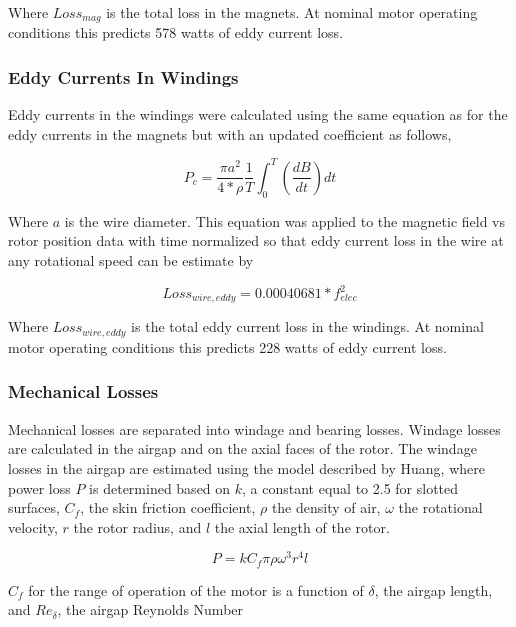 \documentclass[]{aiaa-tc}%
\begin{document}
Where $Loss_{mag}$ is the total loss in the magnets. At nominal motor operating conditions this predicts 578 watts of eddy current loss.

\subsubsection{Eddy Currents In Windings}
Eddy currents in the windings were calculated using the same equation as for the eddy currents in the magnets but with an updated coefficient as follows,

\begin{equation}
P_{c} = \frac{\pi a^2}{4*\rho}\frac{1}{T}\int_{0}^{T}(\frac{dB}{dt})dt
\label{eq:EddyLoss3}
\end{equation}

Where $a$ is the wire diameter. This equation was applied to the magnetic field vs rotor position data with time normalized so that eddy current loss in the wire at any rotational speed can be estimate by

\begin{equation}
Loss_{wire,eddy} = 0.00040681*f_{elec}^{2}
\label{eq:EddyLoss4}
\end{equation}

Where $Loss_{wire,eddy}$ is the total eddy current loss in the windings. At nominal motor operating conditions this predicts 228 watts of eddy current loss.

\subsubsection{Mechanical Losses}

Mechanical losses are separated into windage and bearing losses. Windage losses are calculated in the airgap and on the axial faces of the rotor. 
The windage losses in the airgap are estimated using the model described by Huang,\cite{Huang} where power loss $P$ is determined based on $k$, a constant equal to 2.5 for slotted surfaces, $C_{f}$, the skin friction coefficient, $\rho$ the density of air, $\omega$ the rotational velocity, $r$ the rotor radius, and $l$ the axial length of the rotor.

\begin{equation}
P = kC_{f}\pi\rho\omega^{3}r^{4}l
\label{eq:Windage}
\end{equation}

$C_{f}$ for the range of operation of the motor is a function of $\delta$, the airgap length, and $Re_{\delta}$, the airgap Reynolds Number
\end{document}
